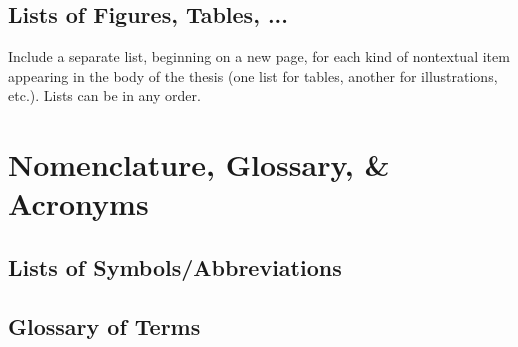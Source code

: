 
		\subsection{Lists of Figures, Tables, ...}
			Include a separate list, beginning on a new page, for each kind of nontextual item appearing in the body of the thesis (one list for tables, another for illustrations, etc.). Lists can be in any order.  

	\section{Nomenclature, Glossary, \& Acronyms}
		\subsection{Lists of Symbols/Abbreviations}
			

		\subsection{Glossary of Terms}
			

